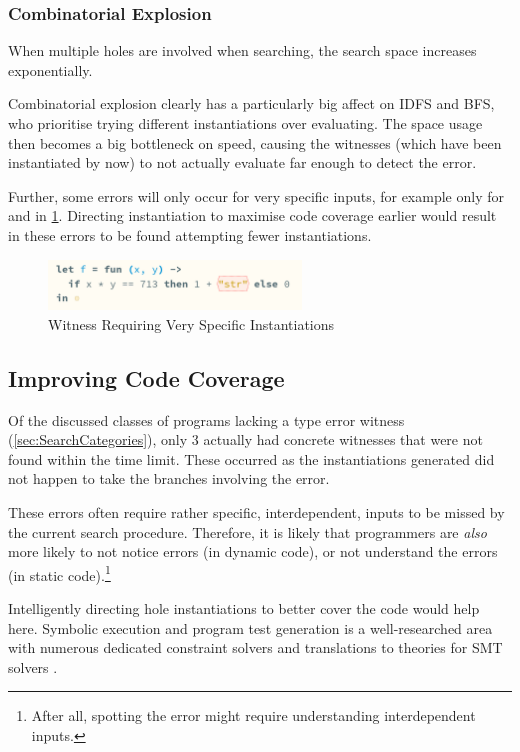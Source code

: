 \subsubsection{Combinatorial Explosion}
When multiple holes are involved when searching, the search space increases exponentially.

Combinatorial explosion clearly has a particularly big affect on IDFS and BFS, who prioritise trying different instantiations over evaluating. The space usage then becomes a big bottleneck on speed, causing the witnesses (which have been instantiated by now) to not actually evaluate far enough to detect the error.

Further, some errors will only occur for very specific inputs, for example only for  and  in \cref{fig:SpecificInstantiations}. Directing instantiation to maximise code coverage earlier would result in these errors to be found attempting fewer instantiations.
\begin{figure}\centering
\includegraphics[width=0.6\textwidth]{Media/Figures/very_specific_error}
\caption{Witness Requiring Very Specific Instantiations}
\label{fig:SpecificInstantiations}
\end{figure}

\subsection{Improving Code Coverage}
\label{sec:EvalHoleInstantiation}
Of the discussed classes of programs lacking a type error witness (\cref{sec:SearchCategories}), only 3 actually had concrete witnesses that were not found within the time limit. These occurred as the instantiations generated did not happen to take the branches involving the error.

These errors often require rather specific, interdependent, inputs to be missed by the current search procedure. Therefore, it is likely that programmers are \textit{also} more likely to not notice errors (in dynamic code), or not understand the errors (in static code).\footnote{After all, spotting the error might require understanding interdependent inputs.}

Intelligently directing hole instantiations to better cover the code would help here. Symbolic execution and program test generation is a well-researched area with numerous dedicated constraint solvers \cite{CITE MANY HERE} and translations to theories for SMT solvers \cite{CITE}.

